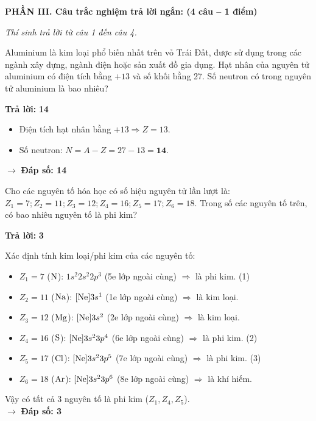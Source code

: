 \documentclass[11pt,a4paper]{article}
\begin{document}
\vspace{6pt}
\noindent
\textbf{\large\color{mainGreen}PHẦN III. Câu trắc nghiệm trả lời ngắn: (4 câu – 1 điểm)}

\textit{Thí sinh trả lời từ câu 1 đến câu 4.}
\vspace{4pt}

\begin{ex}%
Aluminium là kim loại phổ biến nhất trên vỏ Trái Đất, được sử dụng trong các ngành xây dựng, ngành điện hoặc sản xuất đồ gia dụng. Hạt nhân của nguyên tử aluminium có điện tích bằng $+13$ và số khối bằng 27. Số neutron có trong nguyên tử aluminium là bao nhiêu?

\textbf{Trả lời: } \textbf{\color{hfRed}14}
\begin{loigiai}
\begin{itemize}[leftmargin=0.8cm]
\item Điện tích hạt nhân bằng $+13 \Rightarrow Z = 13$.
\item Số neutron: $N = A - Z = 27 - 13 = \mathbf{14}$.
\end{itemize}
$\rightarrow$ \textbf{Đáp số: 14}
\end{loigiai}
\end{ex}

\begin{ex}%
Cho các nguyên tố hóa học có số hiệu nguyên tử lần lượt là: $Z_1 = 7; Z_2 = 11; Z_3 = 12; Z_4 = 16; Z_5 = 17; Z_6 = 18$. Trong số các nguyên tố trên, có bao nhiêu nguyên tố là phi kim?

\textbf{Trả lời: } \textbf{\color{hfRed}3}
\begin{loigiai}
Xác định tính kim loại/phi kim của các nguyên tố:
\begin{itemize}[leftmargin=0.8cm]
\item $Z_1 = 7$ ($\ce{N}$): $1s^2 2s^2 2p^3$ (5e lớp ngoài cùng) $\Rightarrow$ là phi kim. (1)
\item $Z_2 = 11$ ($\ce{Na}$): $[\ce{Ne}]3s^1$ (1e lớp ngoài cùng) $\Rightarrow$ là kim loại.
\item $Z_3 = 12$ ($\ce{Mg}$): $[\ce{Ne}]3s^2$ (2e lớp ngoài cùng) $\Rightarrow$ là kim loại.
\item $Z_4 = 16$ ($\ce{S}$): $[\ce{Ne}]3s^2 3p^4$ (6e lớp ngoài cùng) $\Rightarrow$ là phi kim. (2)
\item $Z_5 = 17$ ($\ce{Cl}$): $[\ce{Ne}]3s^2 3p^5$ (7e lớp ngoài cùng) $\Rightarrow$ là phi kim. (3)
\item $Z_6 = 18$ ($\ce{Ar}$): $[\ce{Ne}]3s^2 3p^6$ (8e lớp ngoài cùng) $\Rightarrow$ là khí hiếm.
\end{itemize}
Vậy có tất cả 3 nguyên tố là phi kim ($Z_1, Z_4, Z_5$).\\
$\rightarrow$ \textbf{Đáp số: 3}
\end{loigiai}
\end{ex}
\end{document}
